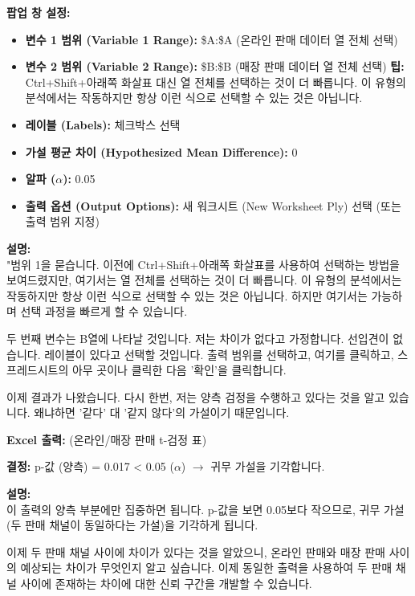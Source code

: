 \documentclass[11pt,a4paper]{book}
\theoremstyle{definition}
\begin{document}
\begin{infobox}[title=온라인/매장 Excel 워크시트 (5/10): t-검정 설정 입력 (열 선택)]
\textbf{팝업 창 설정:}
\begin{itemize}
    \item \textbf{변수 1 범위 (Variable 1 Range):} \$A:\$A (온라인 판매 데이터 열 전체 선택)
    \item \textbf{변수 2 범위 (Variable 2 Range):} \$B:\$B (매장 판매 데이터 열 전체 선택)
    \textbf{팁:} Ctrl+Shift+아래쪽 화살표 대신 열 전체를 선택하는 것이 더 빠릅니다. 이 유형의 분석에서는 작동하지만 항상 이런 식으로 선택할 수 있는 것은 아닙니다.
    \item \textbf{레이블 (Labels):} 체크박스 선택
    \item \textbf{가설 평균 차이 (Hypothesized Mean Difference):} 0
    \item \textbf{알파 ($\alpha$):} 0.05
    \item \textbf{출력 옵션 (Output Options):} 새 워크시트 (New Worksheet Ply) 선택 (또는 출력 범위 지정)
\end{itemize}

\textbf{설명:} \\
"범위 1을 묻습니다. 이전에 Ctrl+Shift+아래쪽 화살표를 사용하여 선택하는 방법을 보여드렸지만, 여기서는 열 전체를 선택하는 것이 더 빠릅니다. 이 유형의 분석에서는 작동하지만 항상 이런 식으로 선택할 수 있는 것은 아닙니다. 하지만 여기서는 가능하며 선택 과정을 빠르게 할 수 있습니다.

두 번째 변수는 B열에 나타날 것입니다. 저는 차이가 없다고 가정합니다. 선입견이 없습니다. 레이블이 있다고 선택할 것입니다. 출력 범위를 선택하고, 여기를 클릭하고, 스프레드시트의 아무 곳이나 클릭한 다음 '확인'을 클릭합니다.

이제 결과가 나왔습니다. 다시 한번, 저는 양측 검정을 수행하고 있다는 것을 알고 있습니다. 왜냐하면 '같다' 대 '같지 않다'의 가설이기 때문입니다.
\end{infobox}

\begin{infobox}[title=온라인/매장 Excel 워크시트 (6/10): 결과 분석 및 결정]
\textbf{Excel 출력:} (온라인/매장 판매 t-검정 표)

\textbf{결정:}
p-값 (양측) = 0.017 < 0.05 ($\alpha$) $\rightarrow$ 귀무 가설을 기각합니다.

\textbf{설명:} \\
이 출력의 양측 부분에만 집중하면 됩니다. p-값을 보면 0.05보다 작으므로, 귀무 가설(두 판매 채널이 동일하다는 가설)을 기각하게 됩니다.

이제 두 판매 채널 사이에 차이가 있다는 것을 알았으니, 온라인 판매와 매장 판매 사이의 예상되는 차이가 무엇인지 알고 싶습니다. 이제 동일한 출력을 사용하여 두 판매 채널 사이에 존재하는 차이에 대한 신뢰 구간을 개발할 수 있습니다.
\end{infobox}
\end{document}

